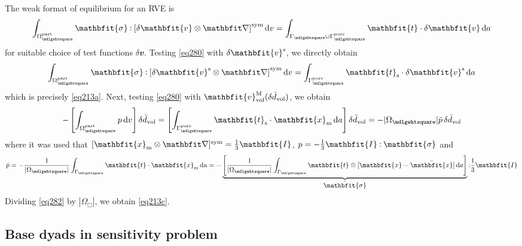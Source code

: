 \documentclass[10pt,a4paper,fleqn]{article}
\renewcommand{\ta}[1]{\mathbfit{#1}}
\renewcommand{\ts}[1]{\mathbfit{#1}}
\renewcommand{\Box}{\mdlgwhtsquare}
\newcommand{\pore}{\mathrm{pore}}
\newcommand{\particle}{\mathrm{part}}
\newcommand{\surf}{\mathrm{s}}
\begin{document}
The weak format of equilibrium for an RVE is
\begin{equation}
    \int_{\Omega^\particle_\Box} \ts{\sigma} \dprod \left[\delta \ta{v}\outerp\diff\right]^\sym \dif v =
    \int_{\Gamma_\Box\cup\Gamma_\Box^\pore} \ta{t} \cdot \delta\ta{v} \dif a
\label{eq280}
\end{equation}
for suitable choice of test functions $\delta \ta{v}$. Testing \eqref{eq280} with $\delta \ta{v}^\fluct$, we directly obtain
\begin{equation}
    \int_{\Omega^\particle_\Box} \ts{\sigma} \dprod \left[\delta \ta{v}^\fluct\outerp\diff\right]^\sym \dif v =
    \int_{\Gamma_\Box^\pore} \ta{t}_\surf \cdot \delta\ta{v}^\fluct \dif a
\label{eq281}
\end{equation}
which is precisely \eqref{eq213a}. Next, testing \eqref{eq280} with $\ta{v}^\macro_\vol(\delta\bar{d}_\vol)$, we obtain
\begin{equation}
    - \left[\int_{\Omega^\particle_\Box} p  \dif v \right]\delta\bar{d}_\vol =
    \left[\int_{\Gamma_\Box^\pore} \ta{t}_\surf \cdot \ta{x}_\mean \dif a\right]\delta\bar{d}_\vol =
    - |\Omega_\Box|\bar{p}\,\delta\bar{d}_\vol
\label{eq282}
\end{equation}
where it was used that $[\ta{x}_\mean\outerp\diff]^\sym=\frac{1}{3}\ts{I}$, $p=-\frac{1}{3}\ts{I}\dprod\ts{\sigma}$ and
\begin{equation}
    \bar{p} = - \frac{1}{|\Omega_\Box|} \int_{\Gamma_\Box} \ta{t} \cdot \ta{x}_\mean \dif a =
     - \underbrace{\left[\frac{1}{|\Omega_\Box|} \int_{\Gamma_\Box} \ta{t} \outerp [\ta{x}-\bar{\ta{x}}] \dif a\right]}_{\displaystyle\bar{\ts\sigma}}  \dprod \frac{1}{3}\ts{I}
\end{equation}
Dividing \eqref{eq282} by $|\Omega_\Box|$, we obtain \eqref{eq213c}.

\subsection{Base dyads in sensitivity problem}
\end{document}
